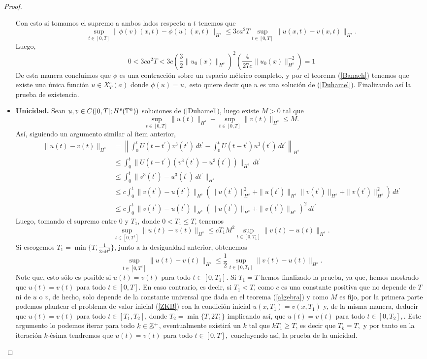 \begin{proof}
\begin{itemize}
        Con esto si tomamos el supremo a ambos lados respecto a $t$ tenemos que
       $$\sup_{t\in[0,T]}\|\phi(v)(x,t)-\phi(u)(x,t)\|_{H^s}\leq 3ca^2T\sup_{t\in[0,T]}\|u(x,t)-v(x,t)\|_{H^s}.$$
       Luego,
       $$0<3ca^2T<3c\left(\dfrac{3}{2}\|u_0(x)\|_{H^s}\right)^2\left(\dfrac{4}{27c}\|u_0(x)\|^{-2}_{H^s}\right)=1$$
       De esta manera concluimos que $\phi$ es una contracción sobre un espacio métrico completo, y por el teorema (\ref{Banach}) tenemos que existe una única función $u\in X^s_T(a)$ donde $\phi(u)=u,$ esto quiere decir que $u$ es una solución de (\ref{Duhamel}). Finalizando así la prueba de  existencia.
       \item \textbf{Unicidad.} Sean $u,v\in C([0,T];H^s(\mathbb{T}^n))$ soluciones de (\ref{Duhamel}), luego existe $M>0$ tal que
       $$\sup_{t\in[0,T]}\|u(t)\|_{H^s}+\sup_{t\in[0,T]}\|v(t)\|_{H^s}\leq M.$$
       Así, siguiendo un argumento similar al ítem anterior,
       \begin{align*}
           \|u(t)-v(t)\|_{H^s}&=\left\|\int_0^tU(t-t^\prime)v^3(t^\prime)\,dt^\prime-\int_0^tU(t-t^\prime)u^3(t^\prime)\,dt^\prime\right\|_{H^s}\\
           &\leq\int_0^t\|U(t-t^\prime)(v^3(t^\prime)-u^3(t^\prime))\|_{H^s}\,dt^\prime\\
           &\leq\int_0^t\|v^3(t^\prime)-u^3(t^\prime)\,dt^\prime\|_{H^s}\\
           &\leq c\int_0^t\|v(t^\prime)-u(t^\prime)\|_{H^s}(\|u(t^\prime)\|^2_{H^s}+\|u(t^\prime)\|_{H^s}\|v(t^\prime)\|_{H^s}+\|v(t^\prime)\|^2_{H^s})\,dt^\prime\\
           &\leq c\int_0^t\|v(t^\prime)-u(t^\prime)\|_{H^s}(\|u(t^\prime)\|_{H^s}+\|v(t^\prime)\|_{H^s})^2\,dt^\prime
       \end{align*}
       Luego, tomando el supremo entre 0 y $T_1$, donde $0<T_1\leq T$, tenemos
       $$\sup_{t\in[0,T^1]}\|u(t)-v(t)\|_{H^s}\leq cT_1M^2\sup_{t\in[0,T_1]}\|v(t)-u(t)\|_{H^s}. $$
       Si escogemos $T_1=\min\{T,\frac{1}{2cM^2}\}$, junto a la desigualdad anterior, obtenemos
       $$\sup_{t\in[0,T^1]}\|u(t)-v(t)\|_{H^s}\leq \frac{1}{2}\sup_{t\in[0,T_1]}\|v(t)-u(t)\|_{H^s}.$$
       Note que, esto sólo es posible si $u(t)=v(t)$ para todo $t\in[0,T_1].$ Si $T_1=T$ hemos finalizado la prueba, ya que, hemos mostrado que $u(t)=v(t)$ para todo $t\in[0,T].$ En caso contrario, es decir, si $T_1<T$, como $c$ es una constante positiva que no depende de $T$ ni de $u$ o $v$, de hecho, solo depende de la constante universal que dada en el teorema (\ref{algebra}) y como $M$ es fijo, por la primera parte podemos plantear el problema de valor inicial (\ref{ZKB}) con la condición inicial $u(x,T_1)=v(x,T_1)$ y, de la misma manera, deducir que $u(t)=v(t)$ para todo $t\in[T_1,T_2]$, donde $T_2=\min\{T,2T_1\}$ implicando así, que $u(t)=v(t)$ para todo $t\in[0,T_2],$. Este argumento lo podemos iterar para todo $k\in \mathbb{Z}^+$, eventualmente existirá un $k$ tal que $kT_1\geq T$, es decir que $T_k=T,$ y por tanto en la iteración $k$-ésima tendremos que $u(t)=v(t)$ para todo $t\in[0,T],$ concluyendo así, la prueba de la unicidad.

\end{itemize}
\end{proof}
